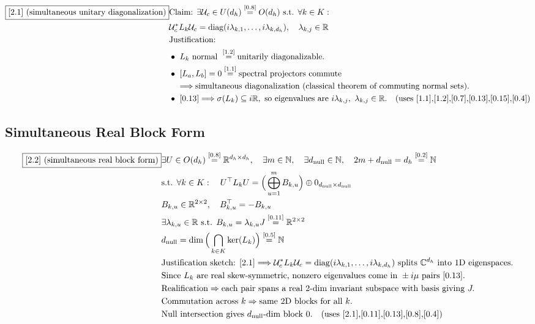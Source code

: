 \documentclass[11pt]{article}
\newcommand{\eqref}[1]{\overset{[#1]}{=}}
\begin{document}
\begin{align}
\boxed{[2.1] \text{ (simultaneous unitary diagonalization)}}
&\text{Claim: }\exists \mathcal{U}_c \in U(d_h)
\eqref{0.8}
O(d_h)
\text{ s.t. }
\forall k\in K:\ \notag\\
&\mathcal{U}_c^* L_k \mathcal{U}_c
=
\operatorname{diag}(i\lambda_{k,1},\dots,i\lambda_{k,d_h}),
\quad
\lambda_{k,j}
\in
\mathbb{R} \notag\\
&\text{Justification:} \notag\\
&\bullet\ L_k \text{ normal } \eqref{1.2} \text{unitarily diagonalizable.} \notag\\
&\bullet\ [L_a,L_b]=0 \eqref{1.1} \text{spectral projectors commute} \notag\\
&\quad\Longrightarrow \text{simultaneous diagonalization (classical theorem of commuting normal sets).} \notag\\
&\bullet\ [0.13] \Longrightarrow \sigma(L_k)\subseteq i\mathbb{R}, \text{ so eigenvalues are }i\lambda_{k,j},\ \lambda_{k,j}\in\mathbb{R}.
\quad(\text{uses [1.1],[1.2],[0.7],[0.13],[0.15],[0.4]})
\end{align}

\subsection{Simultaneous Real Block Form}

\begin{align}
\boxed{[2.2] \text{ (simultaneous real block form)}}
&\exists
U
\in
O(d_h)
\eqref{0.8}
\mathbb{R}^{d_h\times d_h},
\quad
\exists m\in\mathbb{N},
\quad
\exists d_{\mathrm{null}}\in\mathbb{N},
\quad
2m+d_{\mathrm{null}}
=
d_h
\eqref{0.2}
\mathbb{N} \notag\\
&\text{s.t. }
\forall k\in K:\quad
U^\top L_k U
=
\Big(
\bigoplus_{u=1}^m
B_{k,u}
\Big)
\oplus
0_{d_{\mathrm{null}}\times d_{\mathrm{null}}} \notag\\
&B_{k,u}
\in
\mathbb{R}^{2\times 2},
\quad
B_{k,u}^\top
=
-B_{k,u} \notag\\
&\exists
\lambda_{k,u}
\in
\mathbb{R}
\text{ s.t. }
B_{k,u}
=
\lambda_{k,u}
J
\eqref{0.11}
\mathbb{R}^{2\times 2} \notag\\
&d_{\mathrm{null}}
=
\dim\Big(\bigcap_{k\in K} \ker(L_k)\Big)
\eqref{0.5}
\mathbb{N} \notag\\
&\text{Justification sketch: }[2.1]
\Longrightarrow
\mathcal{U}_c^*L_k\mathcal{U}_c
=
\operatorname{diag}(i\lambda_{k,1},\dots,i\lambda_{k,d_h})
\text{ splits } \mathbb{C}^{d_h} \text{ into 1D eigenspaces.} \notag\\
&\text{Since }L_k\text{ are real skew-symmetric, nonzero eigenvalues come in }\pm i\mu\text{ pairs }[0.13]. \notag\\
&\text{Realification} \Rightarrow \text{each pair spans a real }2\text{-dim invariant subspace with basis giving }J. \notag\\
&\text{Commutation across }k \Rightarrow \text{same }2\text{D blocks for all }k. \notag\\
&\text{Null intersection gives }d_{\mathrm{null}}\text{-dim block }0.
\quad(\text{uses [2.1],[0.11],[0.13],[0.8],[0.4]})
\end{align}
\end{document}
